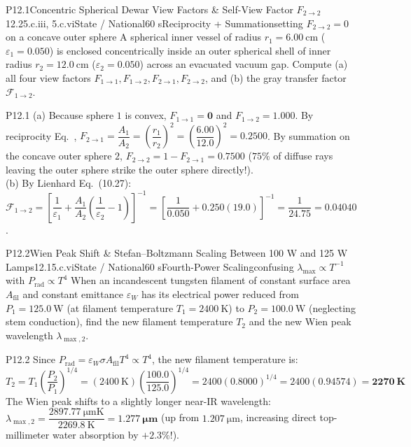 \begin{problem}{P12.1}{Concentric Spherical Dewar View Factors \& Self-View Factor $F_{2\to 2}$}{12.2}{5.c.iii, 5.c.vi}{State / National}{60 s}{Reciprocity + Summation}{setting $F_{2\to 2} = 0$ on a concave outer sphere}
A spherical inner vessel of radius $r_1 = \SI{6.00}{\centi\meter}$ ($\varepsilon_1 = 0.050$) is enclosed concentrically inside an outer spherical shell of inner radius $r_2 = \SI{12.0}{\centi\meter}$ ($\varepsilon_2 = 0.050$) across an evacuated vacuum gap. Compute (a) all four view factors $F_{1\to 1}, F_{1\to 2}, F_{2\to 1}, F_{2\to 2}$, and (b) the gray transfer factor $\mathcal{F}_{1\to 2}$.
\end{problem}
\begin{solution}{P12.1}
(a) Because sphere $1$ is convex, $F_{1\to 1} = \mathbf{0}$ and $F_{1\to 2} = \mathbf{1.000}$. By reciprocity Eq.~, $F_{2\to 1} = \dfrac{A_1}{A_2} = \left(\dfrac{r_1}{r_2}\right)^{\!2} = \left(\dfrac{6.00}{12.0}\right)^{\!2} = \mathbf{0.2500}$. By summation on the concave outer sphere $2$, $F_{2\to 2} = 1 - F_{2\to 1} = \mathbf{0.7500}$ ($75\%$ of diffuse rays leaving the outer sphere strike the outer sphere directly!).\\
(b) By Lienhard Eq.~(10.27): $\mathcal{F}_{1\to 2} = \left[\dfrac{1}{\varepsilon_1} + \dfrac{A_1}{A_2}\!\left(\dfrac{1}{\varepsilon_2} - 1\right)\right]^{-1} = \left[\dfrac{1}{0.050} + 0.250(19.0)\right]^{-1} = \dfrac{1}{24.75} = \mathbf{0.04040}$.
\end{solution}

\begin{problem}{P12.2}{Wien Peak Shift \& Stefan--Boltzmann Scaling Between 100 W and 125 W Lamps}{12.1}{5.c.vi}{State / National}{60 s}{Fourth-Power Scaling}{confusing $\lambda_{\max} \propto T^{-1}$ with $P_{\mathrm{rad}} \propto T^4$}
When an incandescent tungsten filament of constant surface area $A_{\mathrm{fil}}$ and constant emittance $\varepsilon_W$ has its electrical power reduced from $P_1 = \SI{125.0}{\watt}$ (at filament temperature $T_1 = \SI{2400}{\kelvin}$) to $P_2 = \SI{100.0}{\watt}$ (neglecting stem conduction), find the new filament temperature $T_2$ and the new Wien peak wavelength $\lambda_{\max,2}$.
\end{problem}
\begin{solution}{P12.2}
Since $P_{\mathrm{rad}} = \varepsilon_W \sigma A_{\mathrm{fil}} T^4 \propto T^4$, the new filament temperature is:
\[
  T_2 = T_1\left(\frac{P_2}{P_1}\right)^{\!1/4} = (\SI{2400}{\kelvin})\left(\frac{100.0}{125.0}\right)^{\!1/4} = 2400(0.8000)^{1/4} = 2400(0.94574) = \mathbf{\SI{2270}{\kelvin}}
\]
The Wien peak shifts to a slightly longer near-IR wavelength: $\lambda_{\max,2} = \dfrac{\SI{2897.77}{\micro\meter\kelvin}}{\SI{2269.8}{\kelvin}} = \mathbf{\SI{1.277}{\micro\meter}}$ (up from $\SI{1.207}{\micro\meter}$, increasing direct top-millimeter water absorption by $+2.3\%$!).
\end{solution}


